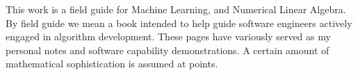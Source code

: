 This work is a field guide for Machine Learning, and Numerical Linear Algebra. By field guide we mean a book intended to help guide software engineers actively engaged in algorithm development.  These pages have variously served as my personal notes and software capability demonstrations.  A certain amount of mathematical sophistication is assumed at points.  

\smallskip

